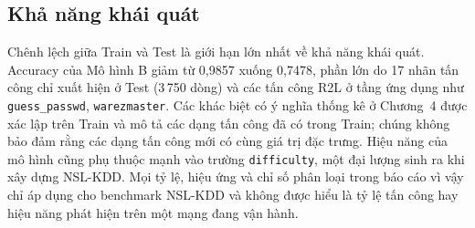 \documentclass[../main.tex]{subfiles}
\begin{document}
\subsection{Khả năng khái quát}
Chênh lệch giữa Train và Test là giới hạn lớn nhất về khả năng khái quát. Accuracy của Mô hình B giảm từ 0,9857 xuống 0,7478, phần lớn do 17 nhãn tấn công chỉ xuất hiện ở Test (3\,750 dòng) và các tấn công R2L ở tầng ứng dụng như \texttt{guess\_passwd}, \texttt{warezmaster}. Các khác biệt có ý nghĩa thống kê ở Chương~4 được xác lập trên Train và mô tả các dạng tấn công đã có trong Train; chúng không bảo đảm rằng các dạng tấn công mới có cùng giá trị đặc trưng. Hiệu năng của mô hình cũng phụ thuộc mạnh vào trường \texttt{difficulty}, một đại lượng sinh ra khi xây dựng NSL-KDD. Mọi tỷ lệ, hiệu ứng và chỉ số phân loại trong báo cáo vì vậy chỉ áp dụng cho benchmark NSL-KDD và không được hiểu là tỷ lệ tấn công hay hiệu năng phát hiện trên một mạng đang vận hành.
\end{document}
